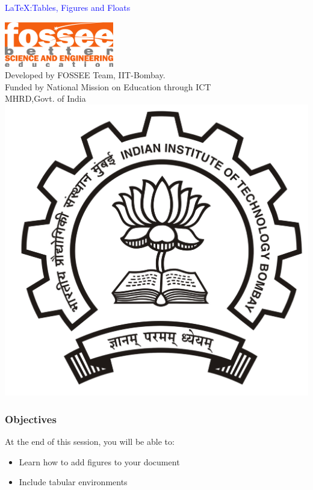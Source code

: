 \documentclass{beamer}
\begin{document}
\begin{frame}

\begin{center}
\vspace{12pt}
\textcolor{blue}{\huge {\LaTeX}:Tables, Figures and Floats}
\end{center}
\vspace{18pt}
\begin{center}
\vspace{10pt}
\includegraphics[scale=0.95]{../images/fossee-logo.png}\\
\vspace{5pt}
\scriptsize Developed by FOSSEE Team, IIT-Bombay. \\ 
\scriptsize Funded by National Mission on Education through ICT\\
\scriptsize  MHRD,Govt. of India\\
\includegraphics[scale=0.15]{../images/iitb-logo.jpg}\\
\end{center}
\end{frame}


\begin{frame}
  \frametitle{Objectives}
  At the end of this session, you will be able to:
  \begin{itemize}
  \item Learn how to add figures to your document
  \item Include tabular environments
  \end{itemize}
\end{frame}
\end{document}
